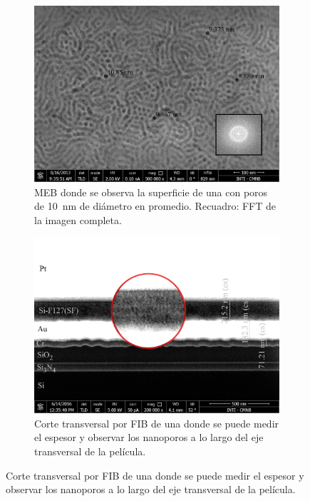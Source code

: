 				\begin{figure}[bh!]
		 	   	    \begin{subfigure}[t]{0.495\textwidth}
			        	\includegraphics[width=\textwidth]{Imagenes/Superficie-F127-medidas.jpg}
			       		\caption{MEB donde se observa la superficie de una \pdmF\space con poros de \SI{10}{nm} de diámetro en promedio. Recuadro: FFT de la imagen completa.}
			       		\label{fig:sem_homogeneidad1}
			       		\end{subfigure}
			       	\begin{subfigure}[t]{0.495\textwidth}
			 	   	    \includegraphics[width=\textwidth]{Imagenes/Perfil-F127.jpg}
			       		\caption{Corte transversal por FIB de una \pdmF\space donde se puede medir el espesor y observar los nanoporos a lo largo del eje transversal de la película.}

\end{subfigure}
\end{figure}
